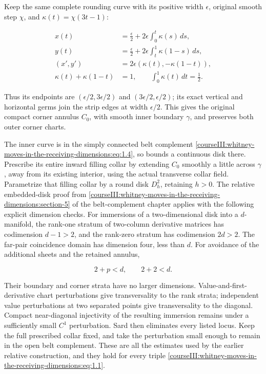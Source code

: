 Keep the same complete rounding curve with its positive width \(\epsilon\), original smooth step \(\chi\), and \(\kappa(t)=\chi(3t-1)\):

\begin{equation}
\begin{aligned}
 x(t)&=\frac{\epsilon}{2}+2\epsilon\int_0^t\kappa(s)\,ds,\\
 y(t)&=\frac{\epsilon}{2}+2\epsilon\int_t^1\kappa(1-s)\,ds,\\
 (x',y')&=2\epsilon(\kappa(t),-\kappa(1-t)),\\
 \kappa(t)+\kappa(1-t)&=1,\qquad
 \int_0^1\kappa(t)\,dt=\frac12 .
 \end{aligned}
 \label{courseIII:whitney-moves-in-the-receiving-dimensions:eq:1.9}
\end{equation}

Thus its endpoints are \((\epsilon/2,3\epsilon/2)\) and \((3\epsilon/2,\epsilon/2)\); its exact vertical and horizontal germs join the strip edges at width \(\epsilon/2\). This gives the original compact corner annulus \(C_0\), with smooth inner boundary \(\gamma\), and preserves both outer corner charts.

The inner curve is in the simply connected belt complement \eqref{courseIII:whitney-moves-in-the-receiving-dimensions:eq:1.4}, so bounds a continuous disk there. Prescribe its entire inward filling collar by extending \(C_0\) smoothly a little across \(\gamma\), away from its existing interior, using the actual transverse collar field. Parametrize that filling collar by a round disk \(D_h^2\), retaining \(h>0\). The relative embedded-disk proof from \cref{courseIII:whitney-moves-in-the-receiving-dimensions:section-5} of the belt-complement chapter applies with the following explicit dimension checks. For immersions of a two-dimensional disk into a \(d\)-manifold, the rank-one stratum of two-column derivative matrices has codimension \(d-1>2\), and the rank-zero stratum has codimension \(2d>2\). The far-pair coincidence domain has dimension four, less than \(d\). For avoidance of the additional sheets and the retained annulus,

\begin{equation}
2+p<d,\qquad 2+2<d .
 \label{courseIII:whitney-moves-in-the-receiving-dimensions:eq:1.10}
\end{equation}

Their boundary and corner strata have no larger dimensions. Value-and-first-derivative chart perturbations give transversality to the rank strata; independent value perturbations at two separated points give transversality to the diagonal. Compact near-diagonal injectivity of the resulting immersion remains under a sufficiently small \(C^1\) perturbation. Sard then eliminates every listed locus. Keep the full prescribed collar fixed, and take the perturbation small enough to remain in the open belt complement. These are all the estimates used by the earlier relative construction, and they hold for every triple \eqref{courseIII:whitney-moves-in-the-receiving-dimensions:eq:1.1}.

